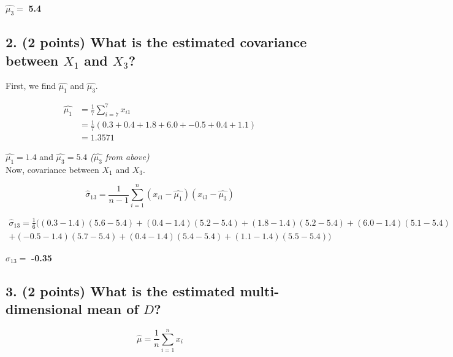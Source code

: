 \documentclass[11pt]{article}
\begin{document}
\begin{tcolorbox}[title=Problem 2.1]
    $\hat{\mu_3} = $ \textbf{5.4}
\end{tcolorbox}

\newpage
\subsection*{\textbf{2. (2 points)} What is the estimated covariance between $X_1$ and $X_3$?}

First, we find $\hat{\mu_1}$ and $\hat{\mu_3}$.

\begin{align*}
    \hat{\mu_1} & = \frac{1}{7} \sum_{i=7}^{7} x_{i1} \\
    & = \frac{1}{7}(0.3 + 0.4 + 1.8 + 6.0 + -0.5 + 0.4 + 1.1) \\
    & = 1.3571
\end{align*}

$\hat{\mu_1} = 1.4$ and $\hat{\mu_3} = 5.4$ \textit{($\hat{\mu_3}$ from above)} \\

Now, covariance between $X_1$ and $X_3$.

$$\hat{\sigma}_{13} = \frac{1}{n-1}\sum_{i=1}^{n} (x_{i1} - \hat{\mu_1})(x_{i3} - \hat{\mu_3})$$

\begin{multline*}
    \hat{\sigma}_{13} = \frac{1}{6}( (0.3 - 1.4)(5.6 - 5.4) + (0.4 - 1.4)(5.2 - 5.4) + (1.8 - 1.4)(5.2 - 5.4) + (6.0 - 1.4)(5.1 - 5.4) \\
    + (-0.5 - 1.4)(5.7 - 5.4) + (0.4 - 1.4)(5.4 - 5.4) + (1.1 - 1.4)(5.5 - 5.4) )
\end{multline*}

\begin{tcolorbox}[title=Problem 2.2]
    $\hat{\sigma}_{13} = $ \textbf{-0.35}
\end{tcolorbox}

\subsection*{\textbf{3. (2 points)} What is the estimated multi-dimensional mean of $D$?}

$$\hat{\mu} = \frac{1}{n} \sum_{i=1}^{n} x_{i}$$

\end{document}

